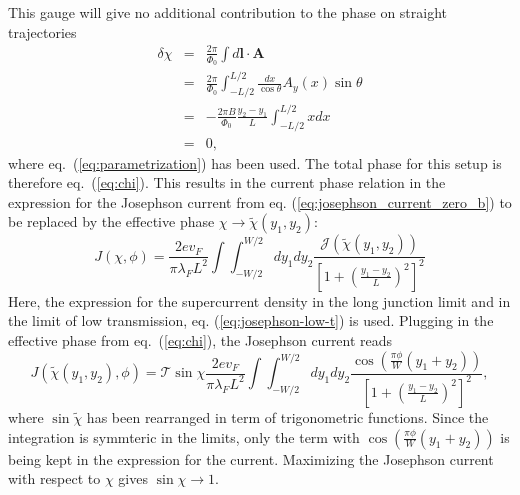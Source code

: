 This gauge will give no additional contribution to the phase on straight trajectories
\begin{eqnarray}
\delta \chi &=& \frac{2 \pi}{\Phi_0} \int d \mathbf{l} \cdot \mathbf{A} \\
&=& \frac{2 \pi}{\Phi_0} \int_{-L/2}^{L/2} \frac{dx}{\cos \theta} A_y (x) \sin \theta \\
&=& - \frac{2 \pi B}{\Phi_0} \frac{y_2 - y_1}{L} \int_{-L/2}^{L/2} x dx \\
&=& 0, \label{eq:magnetic-phase-straight}
\end{eqnarray}
where eq.~(\ref{eq:parametrization}) has been used. The total phase for this setup is therefore eq.~(\ref{eq:chi}). This results in the current phase relation in the expression for the Josephson current from eq. (\ref{eq:josephson_current_zero_b}) to be replaced by the effective phase $\chi \rightarrow \tilde{\chi}(y_1, y_2)$:
\begin{equation}
J\left(\chi, \phi \right) = \frac{2 e v_F}{\pi \lambda_F L^2}  \int \int_{-W/2}^{W/2} d y_1 d y_2 \frac{\mathcal{J}(\tilde{\chi}(y_1, y_2))}{\left[ 1 + \left(\frac{y_1 - y_2}{L}\right)^2\right]^2}
\end{equation}
Here, the expression for the supercurrent density in the long junction limit and in the limit of low transmission, eq. (\ref{eq:josephson-low-t}) is used. Plugging in the effective phase from eq.~(\ref{eq:chi}), the Josephson current reads
\begin{equation}
J(\tilde{\chi}(y_1, y_2), \phi) = \mathcal{T}  \sin \chi  \frac{2 e v_F}{\pi \lambda_F L^2} \int \int_{-W/2}^{W/2} d y_1 d y_2 \frac{\cos \left( \frac{\pi \phi}{W}(y_1 + y_2) \right)}{\left[ 1 + \left(\frac{y_1 - y_2}{L}\right)^2\right]^2} \label{eq:josephson_current},
\end{equation}
where $\sin \tilde{\chi}$ has been rearranged in term of trigonometric functions. Since the integration is symmteric in the limits, only the term with $\cos ( \frac{\pi \phi}{W}(y_1 + y_2) )$ is being kept in the expression for the current. Maximizing the Josephson current with respect to $\chi$ gives $\sin\chi \rightarrow 1$. 

